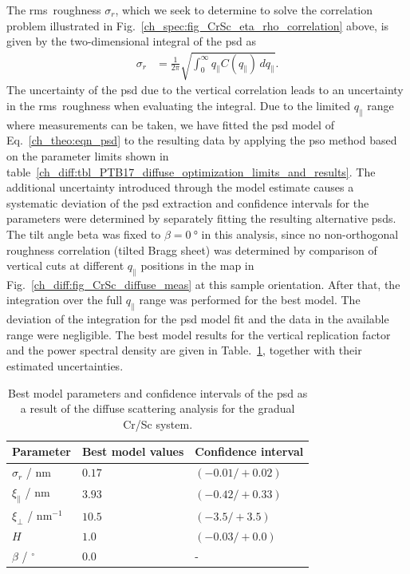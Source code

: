 The \gls{rms}~roughness $\sigma_r$, which we seek to determine to solve the correlation problem illustrated in Fig.~\ref{ch_spec:fig_CrSc_eta_rho_correlation} above, is given by the two-dimensional integral of the \gls{psd} as
\begin{align}
\sigma_r &=\frac{1}{2\pi} \sqrt{\int_{0}^{\infty} q_\parallel C(q_\parallel) \, 
dq_\parallel} \text{.}
\end{align}
The uncertainty of the \gls{psd} due to the vertical correlation leads to an 
uncertainty in the \gls{rms}~roughness when evaluating the integral. Due to the 
limited $q_\parallel$ range where measurements can be taken, we have fitted the 
\gls{psd} model of Eq.~\eqref{ch_theo:eqn_psd} to the resulting data by applying the \gls{pso} method based on the parameter limits shown in table~\ref{ch_diff:tbl_PTB17_diffuse_optimization_limits_and_results}. The additional uncertainty introduced through the model estimate causes a systematic deviation of the \gls{psd} extraction and confidence intervals for the parameters were determined by separately fitting the resulting alternative \gls{psd}s. The tilt angle beta was fixed to $\beta=\SI{0}{\degree}$ in this analysis, since no non-orthogonal roughness correlation (tilted Bragg sheet) was determined by comparison of vertical cuts at different $q_\parallel$ positions in the map in Fig.~\ref{ch_diff:fig_CrSc_diffuse_meas} at this sample orientation. After that, the integration over the full $q_\parallel$ range was performed for the best model. The deviation of the integration for the \gls{psd} model fit and the data in the available range were negligible. The best model results for the vertical replication factor and the power spectral 
density are given in Table.~\ref{ch_diff:tbl_CrSc_psd_results}, together with their estimated
uncertainties.
\begin{table}
\centering
\caption{Best model parameters and confidence intervals of the \gls{psd} as a result of the diffuse scattering analysis for the gradual Cr/Sc system.}
\label{ch_diff:tbl_CrSc_psd_results}
\begin{tabular}{@{}lll@{}}
\toprule
Parameter & Best model values & Confidence interval\\ \midrule
$\sigma_r$ / nm & $0.17  $&$(-0.01/+0.02)$ \\
$\xi_\parallel$ / nm& $3.93 $&$(-0.42 / +0.33)$ \\
$\xi_\perp$  / nm$^{-1}$& $10.5 $&$ (-3.5/+3.5)$ \\
$H$ & $1.0$ & $(-0.03 /+0.0)$ \\
$\beta$ / $^\circ$ & $0.0$ & - \\
 \bottomrule
\end{tabular}
\end{table}

